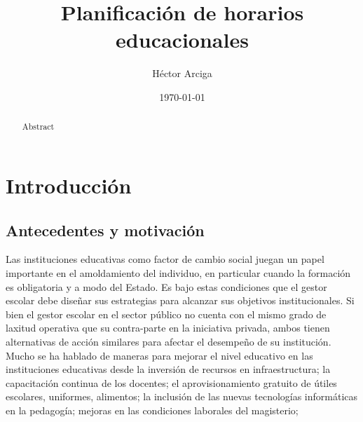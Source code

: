 \documentclass[draft,12pt,headsepline,footsepline,paper=letter]{scrreprt}
\begin{document}
\title{Planificación de horarios educacionales}
\author{Héctor Arciga}
\date{\today}

\maketitle

\begin{abstract}
Abstract
\end{abstract}

\begin{spacing}{1}
\tableofcontents
\glsaddall
\printglossaries
\listoffigures
\listoftables
\end{spacing}

\chapter{Introducción}

\section{Antecedentes y motivación}

Las instituciones educativas como factor de cambio social juegan un papel importante en el amoldamiento del individuo, en particular cuando la formación es obligatoria y a modo del Estado. Es bajo estas condiciones que el gestor escolar debe diseñar sus estrategias para alcanzar sus objetivos institucionales.
Si bien el gestor escolar en el sector público no cuenta con el mismo grado de laxitud operativa que su contra-parte en la iniciativa privada, ambos tienen alternativas de acción similares para afectar el desempeño de su institución.
Mucho se ha hablado de maneras para mejorar el nivel educativo en las instituciones educativas desde la inversión de recursos en infraestructura; la capacitación continua de los docentes; el aprovisionamiento gratuito de útiles escolares, uniformes, alimentos; la  inclusión de las nuevas tecnologías informáticas en la pedagogía; mejoras en las condiciones laborales del magisterio;

\end{document}
